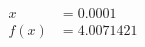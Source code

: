 \documentclass[preview]{standalone}
\begin{document}
\begin{align*}
x &= 0.0001\\f(x) &= 4.0071421
\end{align*}
\end{document}
